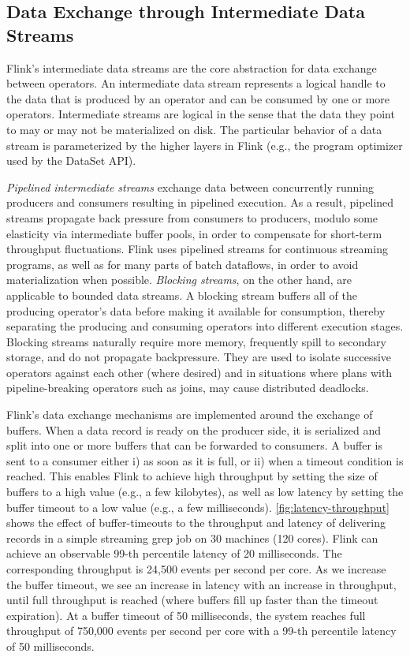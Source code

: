 \subsection{Data Exchange through Intermediate Data Streams}
Flink's intermediate data streams are the core abstraction for data exchange between operators. An intermediate data stream represents a logical handle to the data that is produced by an operator and can be consumed by one or more operators. Intermediate streams are logical in the sense that the data they point to may or may not be materialized on disk. The particular behavior of a data stream is parameterized by the higher layers in Flink (e.g., the program optimizer used by the DataSet API). 


 \emph{Pipelined intermediate streams} exchange data between concurrently running producers and consumers resulting in pipelined execution. As a result, pipelined streams propagate back pressure from consumers to producers, modulo some elasticity via intermediate buffer pools, in order to compensate for short-term throughput fluctuations. Flink uses pipelined streams for continuous streaming programs, as well as for many parts of batch dataflows, in order to avoid materialization when possible. \emph{Blocking streams}, on the other hand, are applicable to bounded data streams. A blocking stream buffers all of the producing operator's data before making it available for consumption, thereby separating the producing and consuming operators into different execution stages. Blocking streams naturally require more memory, frequently spill to secondary storage, and do not propagate backpressure. They are used to isolate successive operators against each other (where desired) and in situations where plans with pipeline-breaking operators such as joins, may cause distributed deadlocks.

 Flink’s data exchange mechanisms are implemented around the exchange of buffers. When a data record is ready on the producer side, it is serialized and split into one or more buffers that can be forwarded to consumers. A buffer is sent to a consumer either i) as soon as it is full, or ii) when a timeout condition is reached. This enables Flink to achieve high throughput by setting the size of buffers to a high value (e.g., a few kilobytes), as well as low latency by setting the buffer timeout to a low value (e.g., a few milliseconds). \autoref{fig:latency-throughput} shows the effect of buffer-timeouts to the throughput and latency of delivering records in a simple streaming grep job on 30 machines (120 cores). Flink can achieve an observable 99-th percentile latency of 20 milliseconds. The corresponding throughput is 24,500 events per second per core. As we increase the buffer timeout, we see an increase in latency with an increase in throughput, until full throughput is reached (where buffers fill up faster than the timeout expiration). At a buffer timeout of 50 milliseconds, the system reaches full throughput of 750,000 events per second per core with a 99-th percentile latency of 50 milliseconds.

